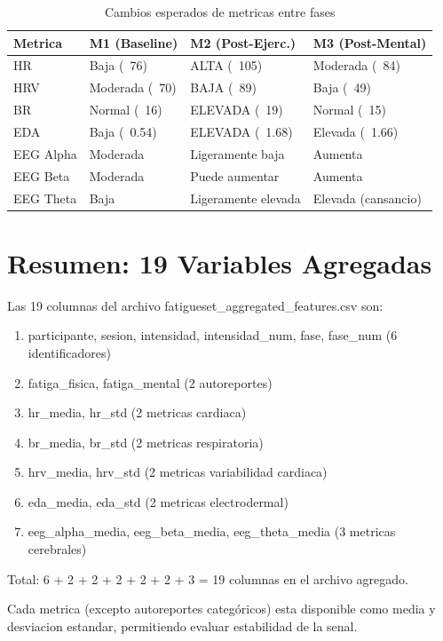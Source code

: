 \begin{table}[H]
\centering
\caption{Cambios esperados de metricas entre fases}
\begin{tabular}{|l|l|l|l|}
\hline
\textbf{Metrica} & \textbf{M1 (Baseline)} & \textbf{M2 (Post-Ejerc.)} & \textbf{M3 (Post-Mental)} \\
\hline
HR & Baja (~76) & ALTA (~105) & Moderada (~84) \\
HRV & Moderada (~70) & BAJA (~89) & Baja (~49) \\
BR & Normal (~16) & ELEVADA (~19) & Normal (~15) \\
EDA & Baja (~0.54) & ELEVADA (~1.68) & Elevada (~1.66) \\
EEG Alpha & Moderada & Ligeramente baja & Aumenta \\
EEG Beta & Moderada & Puede aumentar & Aumenta \\
EEG Theta & Baja & Ligeramente elevada & Elevada (cansancio) \\
\hline
\end{tabular}
\end{table}

\section{Resumen: 19 Variables Agregadas}

Las 19 columnas del archivo fatigueset\_aggregated\_features.csv son:

\begin{enumerate}
    \item participante, sesion, intensidad, intensidad\_num, fase, fase\_num (6 identificadores)
    \item fatiga\_fisica, fatiga\_mental (2 autoreportes)
    \item hr\_media, hr\_std (2 metricas cardiaca)
    \item br\_media, br\_std (2 metricas respiratoria)
    \item hrv\_media, hrv\_std (2 metricas variabilidad cardiaca)
    \item eda\_media, eda\_std (2 metricas electrodermal)
    \item eeg\_alpha\_media, eeg\_beta\_media, eeg\_theta\_media (3 metricas cerebrales)
\end{enumerate}

Total: 6 + 2 + 2 + 2 + 2 + 2 + 3 = 19 columnas en el archivo agregado.

Cada metrica (excepto autoreportes categóricos) esta disponible como media y
desviacion estandar, permitiendo evaluar estabilidad de la senal.
